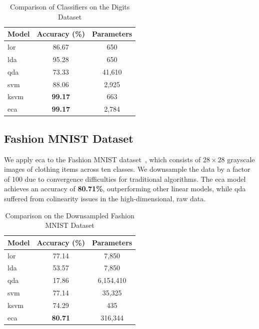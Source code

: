 \documentclass[conference]{IEEEtran}
\begin{document}
\begin{table}[ht]
    \caption{Comparison of Classifiers on the Digits Dataset}
    \centering
    \begin{tabular}{@{}lcc@{}}
        \toprule
        \textbf{Model} & \textbf{Accuracy (\%)} & \textbf{Parameters} \\ \midrule
        \Gls{lor} & 86.67 & 650 \\
        \Gls{lda} & 95.28 & 650 \\
        \Gls{qda} & 73.33 & 41,610 \\
        \Gls{svm} & 88.06 & 2,925 \\
        \Gls{ksvm} & \textbf{99.17} & 663 \\
        \Gls{eca} & \textbf{99.17} & 2,784 \\ \bottomrule
    \end{tabular}
    \label{tab:digits}
\end{table}

\subsection{Fashion MNIST Dataset}

We apply \Gls{eca} to the Fashion MNIST dataset~\cite{xiao2017fashion}, which consists of $28 \times 28$ grayscale images of clothing items across ten classes. We downsample the data by a factor of 100 due to convergence difficulties for traditional algorithms. The \Gls{eca} model achieves an accuracy of \textbf{80.71\%}, outperforming other linear models, while \Gls{qda} suffered from colinearity issues in the high-dimensional, raw data.

\begin{table}[ht]
    \caption{Comparison on the Downsampled Fashion MNIST Dataset}
    \centering
    \begin{tabular}{@{}lcc@{}}
        \toprule
        \textbf{Model} & \textbf{Accuracy (\%)} & \textbf{Parameters} \\ \midrule
        \Gls{lor} & 77.14 & 7,850 \\
        \Gls{lda} & 53.57 & 7,850 \\
        \Gls{qda} & 17.86 & 6,154,410 \\
        \Gls{svm} & 77.14 & 35,325 \\
        \Gls{ksvm} & 74.29 & 435 \\
        \Gls{eca} & \textbf{80.71} & 316,344 \\ \bottomrule
    \end{tabular}
    \label{tab:fashion_mnist}
\end{table}
\end{document}
